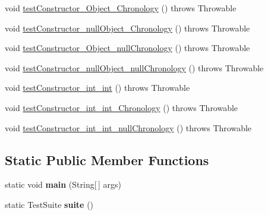 \begin{DoxyCompactItemize}
\item 
void \hyperlink{classorg_1_1joda_1_1time_1_1_test_year_month___constructors_aaac99ad23f86ea039f89146c0b8e9fab}{test\-Constructor\-\_\-\-Object\-\_\-\-Chronology} ()  throws Throwable 
\item 
void \hyperlink{classorg_1_1joda_1_1time_1_1_test_year_month___constructors_af6389aba0056edbcf9e46c07c4e1543b}{test\-Constructor\-\_\-null\-Object\-\_\-\-Chronology} ()  throws Throwable 
\item 
void \hyperlink{classorg_1_1joda_1_1time_1_1_test_year_month___constructors_abae70562fac495fb46197f6ccb2d51eb}{test\-Constructor\-\_\-\-Object\-\_\-null\-Chronology} ()  throws Throwable 
\item 
void \hyperlink{classorg_1_1joda_1_1time_1_1_test_year_month___constructors_a0d0b57af5c0990d077e9a76daa7674ac}{test\-Constructor\-\_\-null\-Object\-\_\-null\-Chronology} ()  throws Throwable 
\item 
void \hyperlink{classorg_1_1joda_1_1time_1_1_test_year_month___constructors_a0ac8412f816881afbf87f14d19228a06}{test\-Constructor\-\_\-int\-\_\-int} ()  throws Throwable 
\item 
void \hyperlink{classorg_1_1joda_1_1time_1_1_test_year_month___constructors_a27151c8145393befbb7a801120e1cd63}{test\-Constructor\-\_\-int\-\_\-int\-\_\-\-Chronology} ()  throws Throwable 
\item 
void \hyperlink{classorg_1_1joda_1_1time_1_1_test_year_month___constructors_ae093550b864e0cc4a2aa7225425ef2bb}{test\-Constructor\-\_\-int\-\_\-int\-\_\-null\-Chronology} ()  throws Throwable 
\end{DoxyCompactItemize}
\subsection*{Static Public Member Functions}
\begin{DoxyCompactItemize}
\item 
\hypertarget{classorg_1_1joda_1_1time_1_1_test_year_month___constructors_a7ebe372e63ade677a1c97b49f5856a98}{static void {\bfseries main} (String\mbox{[}$\,$\mbox{]} args)}\label{classorg_1_1joda_1_1time_1_1_test_year_month___constructors_a7ebe372e63ade677a1c97b49f5856a98}

\item 
\hypertarget{classorg_1_1joda_1_1time_1_1_test_year_month___constructors_af8195014a72db98db32f43be01611284}{static Test\-Suite {\bfseries suite} ()}\label{classorg_1_1joda_1_1time_1_1_test_year_month___constructors_af8195014a72db98db32f43be01611284}

\end{DoxyCompactItemize}
